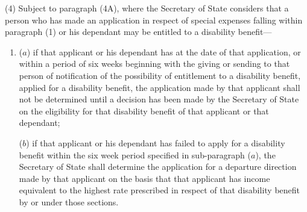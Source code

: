 \documentclass[12pt,a4paper]{article}
\begin{document}
%

(4) Subject to paragraph (4A), where the Secretary of State considers that a person who has made an application in respect of special expenses falling within paragraph (1) or his dependant may be entitled to a disability benefit—
\begin{enumerate}\item[]
($a$) if that applicant or his dependant has at the date of that application, or within a period of six weeks beginning with the giving or sending to that person of notification of the possibility of entitlement to a disability benefit, applied for a disability benefit, the application made by that applicant shall not be determined until a decision has been made by the Secretary of State on the eligibility for that disability benefit of that applicant or that dependant;

($b$) if that applicant or his dependant has failed to apply for a disability benefit within the six week period specified in sub-paragraph ($a$), the Secretary of State shall determine the application for a departure direction made by that applicant on the basis that that applicant has income equivalent to the highest rate prescribed in respect of that disability benefit by or under those sections.
\end{enumerate}
\end{document}
